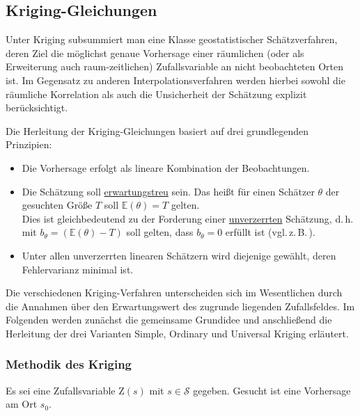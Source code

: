 \subsection{Kriging-Gleichungen}
\label{KapitelTheorieKriging}

Unter Kriging subsummiert man eine Klasse geostatistischer
Schätzverfahren, deren Ziel die möglichst genaue Vorhersage
einer räumlichen (oder als Erweiterung auch raum-zeitlichen) 
Zufallsvariable an nicht beobachteten Orten ist. 
Im Gegensatz zu anderen Interpolationsverfahren werden 
hierbei sowohl die räumliche Korrelation als auch die
Unsicherheit der Schätzung explizit berücksichtigt.

Die Herleitung der Kriging-Gleichungen basiert auf drei grundlegenden Prinzipien:
\begin{itemize}[topsep=2pt,parsep=1pt,itemsep=0.5pt]
\item[$\circ$] Die Vorhersage erfolgt als lineare Kombination der Beobachtungen.
\item[$\circ$] Die Schätzung soll \underline{erwartungstreu} 
sein. Das heißt für einen Schätzer $\theta$ der gesuchten 
Größe $T$
soll $\mathbb{E}\left( \theta\right) = T$ gelten. \\
Dies ist gleichbedeutend zu der Forderung einer 
\underline{unverzerrten} Schätzung,
d.\,h.\,mit $b_{\theta} = (\mathbb{E}\left( \theta \right) - T)$ soll gelten, dass 
$b_{\theta} = 0$ erfüllt ist
(vgl.\,z.\,B.\,\cite[S.\,235]{Henze2019}).
\item[$\circ$] Unter allen unverzerrten linearen Schätzern wird
diejenige gewählt, deren Fehlervarianz minimal ist.
\end{itemize}

Die verschiedenen Kriging-Verfahren unterscheiden sich im Wesentlichen durch 
die Annahmen über den Erwartungswert des zugrunde liegenden Zufallsfeldes. 
Im Folgenden werden zunächst die gemeinsame Grundidee und anschließend die 
Herleitung der drei Varianten Simple, Ordinary und Universal Kriging erläutert.

\subsubsection{Methodik des Kriging}
Es sei eine Zufallsvariable $\mathrm{Z}(s)$ mit 
$s\in \mathcal{S}$ gegeben. Gesucht ist eine Vorhersage 
am Ort $s_0$.

